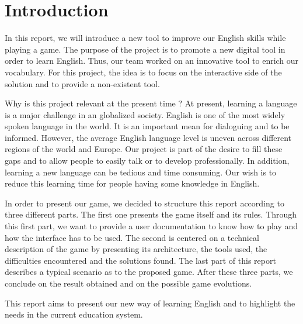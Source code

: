 \documentclass{tnreport}
\begin{document}
\maketitle

\cleardoublepage

\renewcommand{\baselinestretch}{0.5}\normalsize
\tableofcontents
\renewcommand{\baselinestretch}{1.0}\normalsize

\cleardoublepage

\chapter{Introduction}

In this report, we will introduce a new tool to improve our English skills while playing a game. The purpose of the project is to promote a new digital tool in order to learn English. Thus, our team worked on an innovative tool to enrich our vocabulary. For this project, the idea is to focus on the interactive side of the solution and to provide a non-existent tool. 

Why is this project relevant at the present time ? At present, learning a language is a major challenge in an globalized society. English is one of the most widely spoken language in the world. It is an important mean for dialoguing and to be informed. However, the average English language level is uneven across different regions of the world and Europe. Our project is part of the desire to fill these gaps and to allow people to easily talk or to develop professionally. In addition, learning a new language can be tedious and time consuming. Our wish is to reduce this learning time for people having some knowledge in English. 

In order to present our game, we decided to structure this report according to three different parts. The first one presents the game itself and its rules. Through this first part, we want to provide a user documentation to know how to play and how the interface has to be used. The second is centered on a technical description of the game by presenting its architecture, the tools used, the difficulties encountered and the solutions found. The last part of this report describes a typical scenario as to the proposed game. After these three parts, we conclude on the result obtained and on the possible game evolutions. 

This report aims to present our new way of learning English and to highlight the needs in the current education system. 
\end{document}
